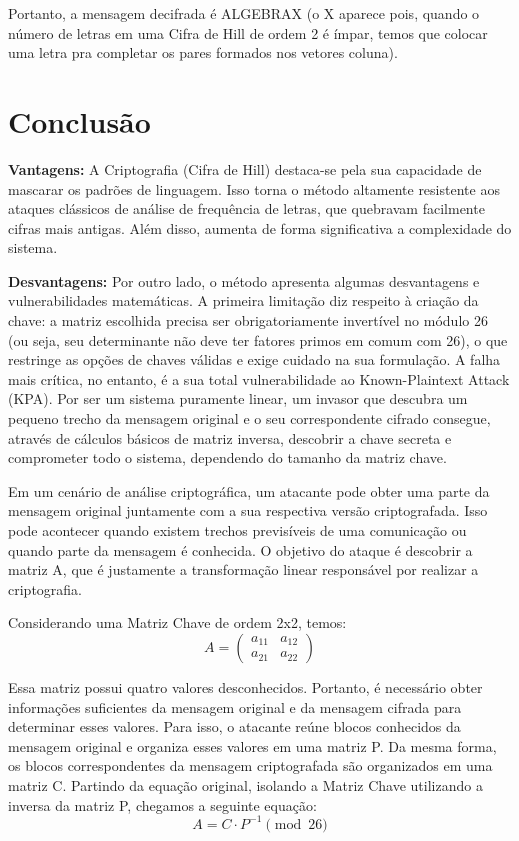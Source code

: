 \documentclass[a4paper,12pt,twocolumn]{article}
\begin{document}
Portanto, a mensagem decifrada é ALGEBRAX (o X aparece pois, quando o número de letras em uma Cifra de Hill de ordem 2 é ímpar, temos que colocar uma letra pra completar os pares formados nos vetores coluna).

\section{Conclusão}
\textbf{Vantagens:}
A Criptografia (Cifra de Hill) destaca-se pela sua capacidade de mascarar os padrões de linguagem. Isso torna o método altamente resistente aos ataques clássicos de análise de frequência de letras, que quebravam facilmente cifras mais antigas. Além disso, aumenta de forma significativa a complexidade do sistema.

\textbf{Desvantagens:}
Por outro lado, o método apresenta algumas desvantagens e vulnerabilidades matemáticas. A primeira limitação diz respeito à criação da chave: a matriz escolhida precisa ser obrigatoriamente invertível no módulo 26 (ou seja, seu determinante não deve ter fatores primos em comum com 26), o que restringe as opções de chaves válidas e exige cuidado na sua formulação. A falha mais crítica, no entanto, é a sua total vulnerabilidade ao Known-Plaintext Attack (KPA). Por ser um sistema puramente linear, um invasor que descubra um pequeno trecho da mensagem original e o seu correspondente cifrado consegue, através de cálculos básicos de matriz inversa, descobrir a chave secreta e comprometer todo o sistema, dependendo do tamanho da matriz chave.

Em um cenário de análise criptográfica, um atacante pode obter uma parte da mensagem original juntamente com a sua respectiva versão criptografada. Isso pode acontecer quando existem trechos previsíveis de uma comunicação ou quando parte da mensagem é conhecida. O objetivo do ataque é descobrir a matriz A, que é justamente a transformação linear responsável por realizar a criptografia.

Considerando uma Matriz Chave de ordem 2x2, temos:
\begin{equation}
A = \begin{pmatrix} a_{11} & a_{12} \\ a_{21} & a_{22} \end{pmatrix}
\end{equation}

Essa matriz possui quatro valores desconhecidos. Portanto, é necessário obter informações suficientes da mensagem original e da mensagem cifrada para determinar esses valores. Para isso, o atacante reúne blocos conhecidos da mensagem original e organiza esses valores em uma matriz P. Da mesma forma, os blocos correspondentes da mensagem criptografada são organizados em uma matriz C. Partindo da equação original, isolando a Matriz Chave utilizando a inversa da matriz P, chegamos a seguinte equação:
\begin{equation}
A = C \cdot P^{-1} \pmod{26}
\end{equation}
\end{document}
